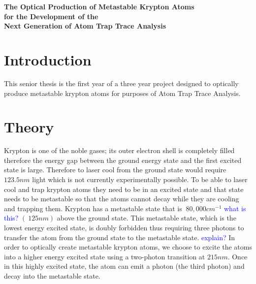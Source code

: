 \documentclass[prb,preprint]{revtex4-1}
\begin{document}
\begin{titlepage}
\thispagestyle{empty}
\begin{center}

\fontsize{20pt}{20pt}\text{   }
\vspace{30mm}

{\fontsize{18pt}{18pt}\selectfont \textbf{The Optical Production of Metastable Krypton Atoms \\ for the Development of the \\ Next Generation of Atom Trap Trace Analysis}}


\vfill
{\fontsize{14pt}{14pt}\selectfont {}}

\vfill




\vfill
{\fontsize{14pt}{14pt} \selectfont {}}


\vfill
\fontsize{12pt}{12pt}{\today}
\vfill

\end{center}
\end{titlepage}


\section{Introduction} 
This senior thesis is the first year of a three year project designed to optically produce metastable krypton atoms for purposes of Atom Trap Trace Analysis.

\section{Theory}

Krypton is one of the noble gases; its outer electron shell is completely filled therefore the energy gap between the ground energy state and the first excited state is large. Therefore to laser cool from the ground state would require $123.5 nm$ light which is not currently experimentally possible. To be able to laser cool and trap krypton atoms they need to be in an excited state and that state needs to be metastable so that the atoms cannot decay while they are cooling and trapping them. Krypton has a metastable state that is $~80,000 cm^{-1}$ \textcolor{blue}{what is this?} $(~125 nm)$ above the ground state.  This metastable state, which is the lowest energy excited state, is doubly forbidden thus requiring three photons to transfer the atom from the ground state to the metastable state. \textcolor{blue}{explain?} In order to optically create metastable krypton atoms, we choose to excite the atoms into a higher energy excited state using a two-photon transition at $215 nm$.  Once in this highly excited state, the atom can emit a photon (the third photon) and decay into the metastable state. 
\end{document}
